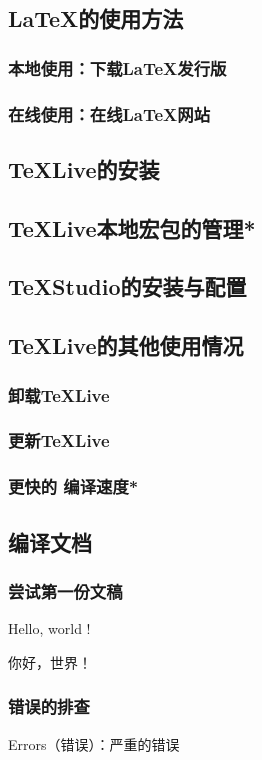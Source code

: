 \documentclass{ctexart}
\begin{document}
    \subsection{\LaTeX 的使用方法}
        \subsubsection{本地使用：下载\LaTeX 发行版}
        \subsubsection{在线使用：在线\LaTeX 网站}
    \subsection{\TeX Live的安装}
    \subsection{\TeX Live本地宏包的管理*}
    \subsection{\TeX Studio的安装与配置}
    \subsection{\TeX Live的其他使用情况}
        \subsubsection{卸载\TeX Live}
        \subsubsection{更新\TeX Live}
        \subsubsection{更快的 编译速度*}
    \subsection{编译文档}
	    \subsubsection{尝试第一份文稿}
		    Hello, world ! 

		    你好，世界！

	    \subsubsection{错误的排查}
            Errors（错误）：严重的错误
\end{document}
